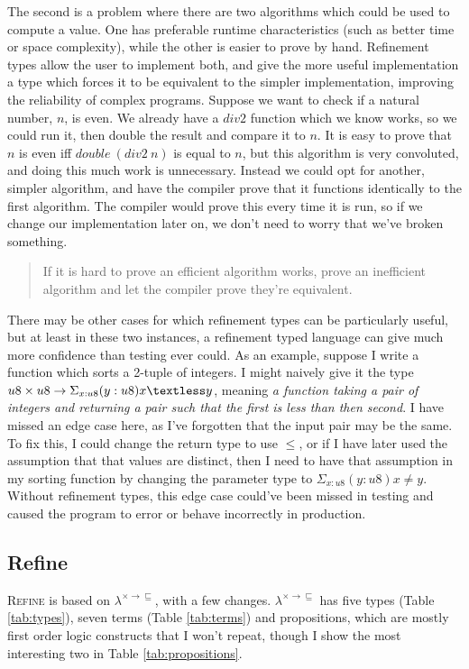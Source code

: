 The second is a problem where there are two algorithms which could be used to compute a value.
One has preferable runtime characteristics (such as better time or space complexity), while
the other is easier to prove by hand.
Refinement types allow the user to implement both, and give the more useful implementation a type
which forces it to be equivalent to the simpler implementation, improving the reliability of complex
programs.
Suppose we want to check if a natural number, $n$, is even.
We already have a $div2$ function which we know works, so we could run it, then double the
result and compare it to $n$.
It is easy to prove that $n$ is even iff $double\ (div2\ n)$ is equal to $n$, but this algorithm
is very convoluted, and doing this much work is unnecessary.
Instead we could opt for another, simpler algorithm, and have the compiler prove that it functions
identically to the first algorithm.
The compiler would prove this every time it is run, so if we change our implementation later on,
we don't need to worry that we've broken something.
\begin{quote}
    If it is hard to prove an efficient algorithm works, prove an inefficient algorithm and let the
    compiler prove they're equivalent.
\end{quote}

There may be other cases for which refinement types can be particularly useful, but at least in
these two instances, a refinement typed language can give much more confidence than testing ever
could.
As an example, suppose I write a function which sorts a 2-tuple of integers.
I might naively give it the type $u8 \times u8 \rightarrow \Sigma_{x:u8} (y:u8){x \textless y}$,
meaning
\textit{a function taking a pair of integers and returning a pair such that the first is less than then second}.
I have missed an edge case here, as I've forgotten that the input pair may be the same.
To fix this, I could change the return type to use $\leq$, or if I have later used the assumption that
that values are distinct, then I need to have that assumption in my sorting function by changing the
parameter type to $\Sigma_{x:u8} (y:u8){x \neq y}$.
Without refinement types, this edge case could've been missed in testing and caused the program to
error or behave incorrectly in production.

\subsection{Refine}

\textsc{Refine} is based on $\lambda^{\times \rightarrow \sqsubseteq}$, with a few changes.
$\lambda^{\times \rightarrow \sqsubseteq}$ has five types (Table \ref{tab:types}),
seven terms (Table \ref{tab:terms}) and propositions, which are mostly first order logic constructs
that I won't repeat, though I show the most interesting two in Table \ref{tab:propositions}.

